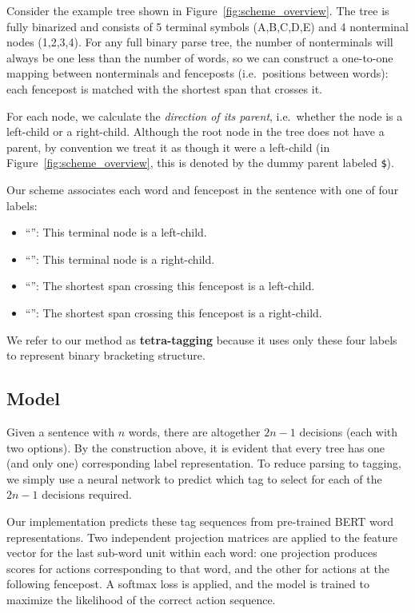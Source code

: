 \documentclass[11pt,a4paper]{article}
\newcommand{\xl}[0]{\rotatebox[origin=c]{45}{$\rightarrow$}}
\newcommand{\xr}[0]{\rotatebox[origin=c]{-45}{$\leftarrow$}}
\newcommand{\xL}[0]{\rotatebox[origin=c]{45}{$\Rightarrow$}}
\newcommand{\xR}[0]{\rotatebox[origin=c]{-45}{$\Leftarrow$}}
\begin{document}
Consider the example tree shown in Figure~\ref{fig:scheme_overview}. The tree is fully binarized and consists of 5 terminal symbols (A,B,C,D,E) and 4 nonterminal nodes (1,2,3,4). For any full binary parse tree, the number of nonterminals will always be one less than the number of words, so we can construct a one-to-one mapping between nonterminals and fenceposts (i.e.\ positions between words): each fencepost is matched with the shortest span that crosses it.

For each node, we calculate the \emph{direction of its parent}, i.e.\ whether the node is a left-child or a right-child. Although the root node in the tree does not have a parent, by convention we treat it as though it were a left-child (in Figure~\ref{fig:scheme_overview}, this is denoted by the dummy parent labeled \texttt{\$}).

\pagebreak
Our scheme associates each word and fencepost in the sentence with one of four labels:
\begin{itemize}
\item ``\xl'': This terminal node is a left-child.
\item ``\xr'': This terminal node is a right-child.
\item ``\xL'': The shortest span crossing this fencepost is a left-child.
\item ``\xR'': The shortest span crossing this fencepost is a right-child.
\end{itemize}
We refer to our method as \textbf{tetra-tagging} because it uses only these four labels to represent binary bracketing structure.

\subsection{Model}

Given a sentence with $n$ words, there are altogether $2n-1$ decisions (each with two options). By the construction above, it is evident that every tree has one (and only one) corresponding label representation.
To reduce parsing to tagging, we simply use a neural network to predict which tag to select for each of the $2n-1$ decisions required.

Our implementation predicts these tag sequences from pre-trained BERT word representations. Two independent projection matrices are applied to the feature vector for the last sub-word unit within each word: one projection produces scores for actions corresponding to that word, and the other for actions at the following fencepost. A softmax loss is applied, and the model is trained to maximize the likelihood of the correct action sequence.
\end{document}
